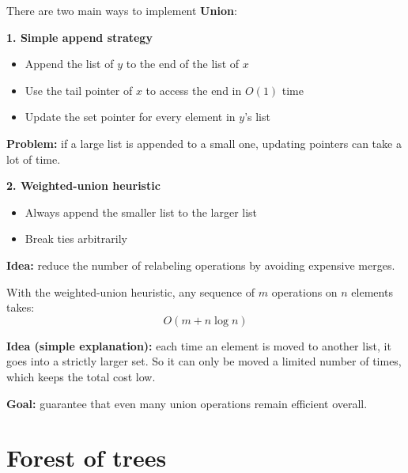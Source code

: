 \documentclass[11pt,a4paper,openany]{book}
\begin{document}
\begin{defnbox}[title=Union Operation (Linked List)]
There are two main ways to implement \textbf{Union}:

\textbf{1. Simple append strategy}
\begin{itemize}
    \item Append the list of $y$ to the end of the list of $x$
    \item Use the tail pointer of $x$ to access the end in $O(1)$ time
    \item Update the set pointer for every element in $y$’s list
\end{itemize}

\textbf{Problem:} if a large list is appended to a small one, updating pointers can take a lot of time.

\textbf{2. Weighted-union heuristic}
\begin{itemize}
    \item Always append the smaller list to the larger list
    \item Break ties arbitrarily
\end{itemize}

\textbf{Idea:} reduce the number of relabeling operations by avoiding expensive merges.
\end{defnbox}

\begin{defnbox}[title=Weighted-Union Theorem]
With the weighted-union heuristic, any sequence of $m$ operations on $n$ elements takes:
\[
O(m + n \log n)
\]

\textbf{Idea (simple explanation):} each time an element is moved to another list, it goes into a strictly larger set. So it can only be moved a limited number of times, which keeps the total cost low.

\textbf{Goal:} guarantee that even many union operations remain efficient overall.
\end{defnbox}




\vspace{2cm}





\section{Forest of trees}
\end{document}
